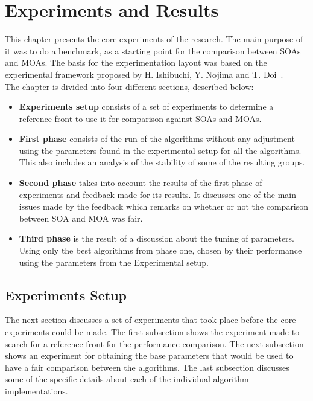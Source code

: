 \chapter{Experiments and Results}
\label{chapter:chapter05}

This chapter presents the core experiments of the research. The main purpose of it was to do a benchmark, as a starting point for the comparison between SOAs and MOAs. The basis for the experimentation layout was based on the experimental framework proposed by H. Ishibuchi, Y. Nojima and T. Doi~\cite{Ishibuchi_single_vs_multiobjective}. \\

The chapter is divided into four different sections, described below:

\begin{itemize}
    \item \textbf{Experiments setup} consists of a set of experiments to determine a reference front to use it for comparison against SOAs and MOAs.
    \item \textbf{First phase} consists of the run of the algorithms without any adjustment using the parameters found in the experimental setup for all the algorithms. This also includes an analysis of the stability of some of the resulting groups.
    \item \textbf{Second phase} takes into account the results of the first phase of experiments and feedback made for its results. It discusses one of the main issues made by the feedback which remarks on whether or not the comparison between SOA and MOA was fair.
    \item \textbf{Third phase} is the result of a discussion about the tuning of parameters. Using only the best algorithms from phase one, chosen by their performance using the parameters from the Experimental setup. 
\end{itemize}

\section{Experiments Setup}

The next section discusses a set of experiments that took place before the core experiments could be made. The first subsection shows the experiment made to search for a reference front for the performance comparison. The next subsection shows an experiment for obtaining the base parameters that would be used to have a fair comparison between the algorithms. The last subsection discusses some of the specific details about each of the individual algorithm implementations.

